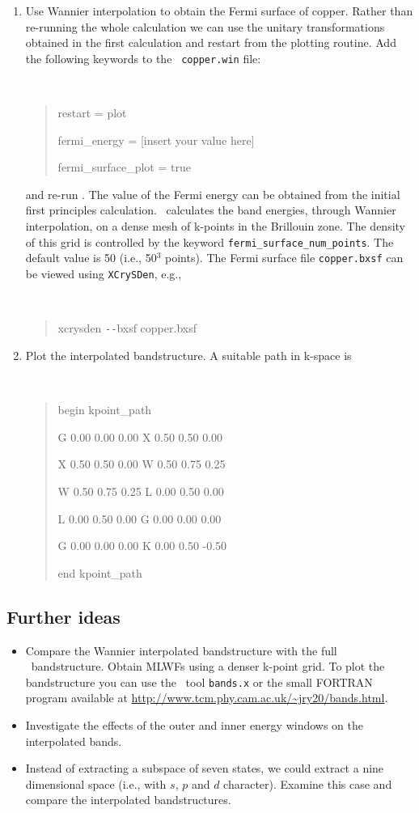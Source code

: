 \documentclass[a4paper,11pt,twoside]{article}
\begin{document}
\begin{enumerate}
\item Use Wannier interpolation to obtain the Fermi surface of
  copper. Rather than re-running the whole calculation we can use the
  unitary transformations obtained in the first calculation and restart
  from the plotting routine. Add the following keywords to the {\tt
    copper.win} file:
{\tt
\begin{quote}
restart = plot

fermi\_energy = [insert your value here] 

fermi\_surface\_plot = true
\end{quote} } and re-run \wannier. The value of the Fermi energy can
be obtained from the initial first principles calculation. \wannier\
calculates the band energies, through Wannier interpolation, on a
dense mesh of k-points in the Brillouin zone. The density of this grid
is controlled by the keyword {\tt fermi\_surface\_num\_points}. The
default value is 50 (i.e., 50$^3$ points).  The Fermi surface file
{\tt copper.bxsf} can be viewed using {\tt XCrySDen}, e.g.,
%
{\tt
\begin{quote}
xcrysden \texttt{-{}-}bxsf copper.bxsf
\end{quote} }


\item Plot the interpolated bandstructure. A suitable path in k-space is
\smallskip
{\tt
\begin{quote}
begin kpoint\_path

G 0.00  0.00  0.00    X 0.50  0.50  0.00

X 0.50  0.50  0.00    W 0.50  0.75  0.25

W 0.50  0.75  0.25    L 0.00  0.50  0.00

L 0.00  0.50  0.00    G 0.00  0.00  0.00

G 0.00  0.00  0.00    K 0.00  0.50 -0.50
 
end kpoint\_path
\end{quote} }
\end{enumerate}

\subsection*{Further ideas}
\begin{itemize}
\item Compare the Wannier interpolated bandstructure with the full
  \pwscf\ bandstructure. Obtain MLWFs using a denser k-point grid.
To plot the bandstructure you can use the \pwscf\ tool {\tt bands.x} or the small FORTRAN program available at \url{http://www.tcm.phy.cam.ac.uk/~jry20/bands.html}.
\item Investigate the effects of the outer and inner energy windows on
  the interpolated bands. 
\item Instead of extracting a subspace of seven states, we could
  extract a nine dimensional space (i.e., with $s$, $p$ and $d$
  character). Examine this case and compare the interpolated
  bandstructures.
\end{itemize}
\end{document}

